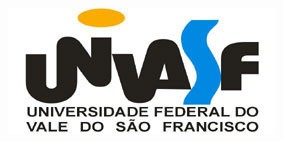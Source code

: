 \begin{capa}
\center
	\includegraphics[scale=0.6]{img/univasf.jpg}

	{\ABNTEXchapterfont\bfseries\large\imprimirinstituicao}

	\vspace*{5cm}
	{\ABNTEXchapterfont\bfseries\large\imprimirautor}

	\vfill
	{\ABNTEXchapterfont\bfseries\large\imprimirtitulo}
	\vfill
	\ABNTEXchapterfont\bfseries\large\imprimirlocal\\ \the\year

	\vspace*{1cm}

\end{capa}
\begin{folhaderosto}
\center
		{\ABNTEXchapterfont\bfseries\large\imprimirautor}
		\vspace*{\fill}

		{\ABNTEXchapterfont\bfseries\large\imprimirtitulo}
		\vspace*{\fill}

		{\hspace{.45\textwidth}
		\begin{minipage}{.5\textwidth}
			\SingleSpacing
			\imprimirpreambulo \\ \\

			{\imprimirorientadorRotulo~\imprimirorientador\par}
			{\imprimircoorientadorRotulo~\imprimircoorientador\par}

		\end{minipage}%
		\vspace*{\fill}}%
		\vspace*{\fill}
			\ABNTEXchapterfont\bfseries\large\imprimirlocal\\ \the\year
		\vspace*{1cm}
\end{folhaderosto}

